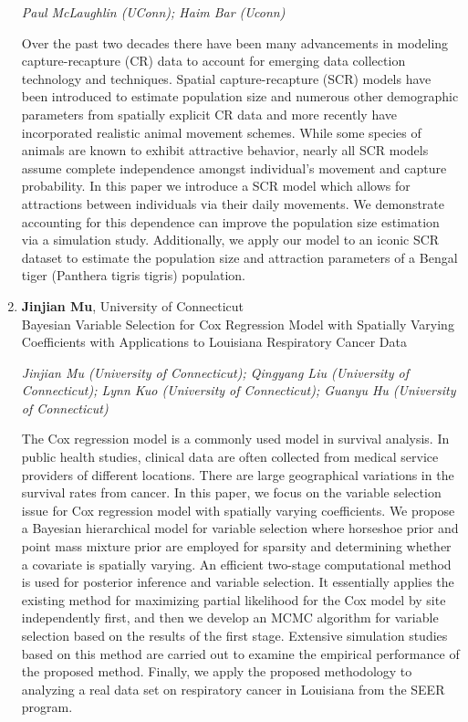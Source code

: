 \begin{enumerate}
\emph{\footnotesize Paul McLaughlin (UConn); Haim Bar (Uconn)}

Over the past two decades there have been many advancements in modeling capture-recapture (CR) data to account for emerging data collection technology and techniques. Spatial capture-recapture (SCR) models have been introduced to estimate population size and numerous other demographic parameters from spatially explicit CR data and more recently have incorporated realistic animal movement schemes. While some species of animals are known to exhibit attractive behavior, nearly all SCR models assume complete independence amongst individual’s movement and capture probability. In this paper we introduce a SCR model which allows for attractions between individuals via their daily movements. We demonstrate accounting for this dependence can improve the population size estimation via a simulation study. Additionally, we apply our model to an iconic SCR dataset to estimate the population size and attraction parameters of a Bengal tiger (Panthera tigris tigris) population.

\item \textbf{Jinjian Mu}, University of Connecticut \\
Bayesian Variable Selection for Cox Regression Model with Spatially Varying Coefficients with Applications to Louisiana Respiratory Cancer Data

\emph{\footnotesize Jinjian Mu (University of Connecticut); Qingyang Liu (University of Connecticut); Lynn Kuo (University of Connecticut); Guanyu Hu (University of Connecticut)}

The Cox regression model is a commonly used model in survival analysis. In public health studies, clinical data are often collected from medical service providers of different locations. There are large geographical variations in the survival rates from cancer. In this paper, we focus on the variable selection issue for Cox regression model with spatially varying coefficients. We propose a Bayesian hierarchical model for variable selection where horseshoe prior and point mass mixture prior are employed for sparsity and determining whether a covariate is spatially varying. An efficient two-stage computational method is used for posterior inference and variable selection. It essentially applies the existing method for maximizing partial likelihood for the Cox model by site independently first, and then we develop an MCMC algorithm for variable selection based on the results of the first stage. Extensive simulation studies based on this method are carried out to examine the empirical performance of the proposed method. Finally, we apply the proposed methodology to analyzing a real data set on respiratory cancer in Louisiana from the SEER program.


\end{enumerate}

